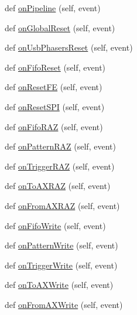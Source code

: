\begin{DoxyCompactItemize}
\item 
def \hyperlink{classProtoFEB__v1_1_1ProtoFEB__v1_abee9bc133cd4291b011fc6f9746c945b}{on\+Pipeline} (self, event)
\item 
def \hyperlink{classProtoFEB__v1_1_1ProtoFEB__v1_a37e3aa3b32821feafcf7f0a3f7edb930}{on\+Global\+Reset} (self, event)
\item 
def \hyperlink{classProtoFEB__v1_1_1ProtoFEB__v1_af5cbe00aedb8c9addca6edae4b6fd33c}{on\+Usb\+Phasers\+Reset} (self, event)
\item 
def \hyperlink{classProtoFEB__v1_1_1ProtoFEB__v1_aa63a526f65c5a13a99d56c89bcb4c7f7}{on\+Fifo\+Reset} (self, event)
\item 
def \hyperlink{classProtoFEB__v1_1_1ProtoFEB__v1_ab186e2261ac831a15d991615fc09a85e}{on\+Reset\+FE} (self, event)
\item 
def \hyperlink{classProtoFEB__v1_1_1ProtoFEB__v1_a4ac4ca3d899a986193fe0c25b4c5d72f}{on\+Reset\+S\+PI} (self, event)
\item 
def \hyperlink{classProtoFEB__v1_1_1ProtoFEB__v1_a7abdc74a7edba3a8e7c3b4bc4a616664}{on\+Fifo\+R\+AZ} (self, event)
\item 
def \hyperlink{classProtoFEB__v1_1_1ProtoFEB__v1_a7f49aab9779b34272906afef8df9f6d7}{on\+Pattern\+R\+AZ} (self, event)
\item 
def \hyperlink{classProtoFEB__v1_1_1ProtoFEB__v1_ab38e96accffbc2a3329955acb9a00ebb}{on\+Trigger\+R\+AZ} (self, event)
\item 
def \hyperlink{classProtoFEB__v1_1_1ProtoFEB__v1_a594e7f8dc94c4e28ac5d2132238983b6}{on\+To\+A\+X\+R\+AZ} (self, event)
\item 
def \hyperlink{classProtoFEB__v1_1_1ProtoFEB__v1_a4829ef01438ae9be1106a715ba8feffd}{on\+From\+A\+X\+R\+AZ} (self, event)
\item 
def \hyperlink{classProtoFEB__v1_1_1ProtoFEB__v1_a1ba3f8146393f309ab8c3b88fb9c1c6e}{on\+Fifo\+Write} (self, event)
\item 
def \hyperlink{classProtoFEB__v1_1_1ProtoFEB__v1_a33df4a0a6bcdd022dd1ff67e57b6d1a4}{on\+Pattern\+Write} (self, event)
\item 
def \hyperlink{classProtoFEB__v1_1_1ProtoFEB__v1_aaadfd193fc5d2893dca1b37ebab68a0f}{on\+Trigger\+Write} (self, event)
\item 
def \hyperlink{classProtoFEB__v1_1_1ProtoFEB__v1_ae6649390f039b699c26021eb1c1e8efb}{on\+To\+A\+X\+Write} (self, event)
\item 
def \hyperlink{classProtoFEB__v1_1_1ProtoFEB__v1_a9bb0cbe720de19edf05beadcd7de581d}{on\+From\+A\+X\+Write} (self, event)

\end{DoxyCompactItemize}
